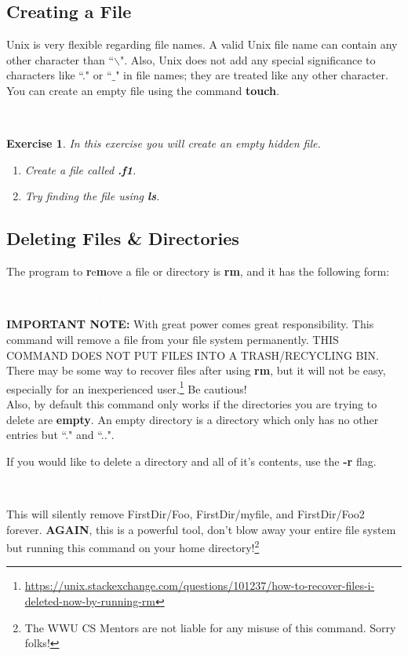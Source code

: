 \documentclass[oneside]{book}
\newcommand{\commandline}[1]{\begin{center} \colorbox{Dark}{\textcolor{white}{#1}} \end{center}}
\newtheorem{ex}{Exercise}[chapter]
\begin{document}
\subsection{Creating a File}

Unix is very flexible regarding file names. A valid Unix file name can contain any other character than ``$\backslash$". Also, Unix does not add any special significance to characters like ``." or ``$\_$" in file names; they are treated like any other character. You can create an empty file using the command \textbf{touch}.
\commandline{touch file_name}

\begin{ex} In this exercise you will create an empty hidden file.
    \begin{enumerate}
        \item Create a file called \textbf{.f1}.
        \item Try finding the file using \textbf{ls}.
    \end{enumerate}        
\end{ex}


\subsection{Deleting Files \& Directories}
The program to \textbf{r}e\textbf{m}ove a file or directory is \textbf{rm}, and it has the following form:
\commandline{rm [OPTION] ... [FILE]...}

\textbf{IMPORTANT NOTE:} With great power comes great responsibility. This command will remove a file from your file system permanently. THIS COMMAND DOES NOT PUT FILES INTO A TRASH/RECYCLING BIN. There may be some way to recover files after using \textbf{rm}, but it will not be easy, especially for an inexperienced user.\footnote{\url{https://unix.stackexchange.com/questions/101237/how-to-recover-files-i-deleted-now-by-running-rm}} Be cautious! \\

Also, by default this command only works if the directories you are trying to delete are \textbf{empty}. An empty directory is a directory which only has no other entries but ``." and ``..".

If you would like to delete a directory and all of it's contents, use the \textbf{-r} flag.\\
\commandline{rm -r FirstDir} 

This will silently remove FirstDir/Foo, FirstDir/myfile, and FirstDir/Foo2 forever. \textbf{AGAIN}, this is a powerful tool, don't blow away your entire file system but running this command on your home directory!\footnote{The WWU CS Mentors are not liable for any misuse of this command. Sorry folks!} 
\end{document}
